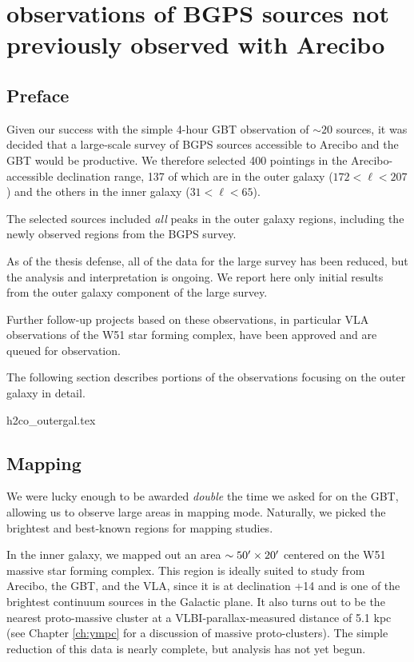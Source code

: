 
\chapter{\formaldehyde observations of BGPS sources not previously observed with Arecibo}


\section{Preface} 

Given our success with the simple 4-hour GBT observation of $\sim20$ sources,
it was decided that a large-scale survey of BGPS sources accessible to Arecibo
and the GBT would be productive.  We therefore selected 400 pointings in the
Arecibo-accessible declination range, 137 of which are in the outer galaxy
($172<\ell<207$) and the others in the inner galaxy ($31<\ell<65$).

The selected sources included \emph{all} peaks in the outer galaxy regions,
including the newly observed regions from the BGPS \vtwo survey.

As of the thesis defense, all of the data for the large survey has been reduced,
but the analysis and interpretation is ongoing.  We report here only initial
results from the outer galaxy component of the large survey.

Further follow-up projects based on these observations, in particular VLA
observations of the W51 star forming complex, have been approved and are
queued for observation.

The following section describes portions of the \formaldehyde observations focusing
on the outer galaxy in detail.

{h2co_outergal.tex}


\section{\formaldehyde Mapping}
We were lucky enough to be awarded \emph{double} the time we asked for on the GBT,
allowing us to observe large areas in mapping mode.  
Naturally, we picked the brightest and best-known regions for mapping studies.

In the inner galaxy, we mapped out an area $\sim50\mbox{$^\prime$}\times20\mbox{$^\prime$}$ centered
on the W51 massive star forming complex.  This region is ideally suited to study from Arecibo,
the GBT, and the VLA, since it is at declination +14 and is one of the brightest continuum
sources in the Galactic plane.  It also turns out to be the nearest proto-massive cluster
at a VLBI-parallax-measured distance of 5.1 kpc (see Chapter \ref{ch:ympc} for a discussion
of massive proto-clusters).  The simple reduction of this data is nearly complete, but 
analysis has not yet begun.


